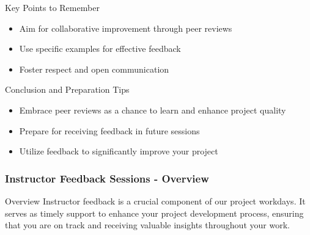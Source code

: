 \documentclass[aspectratio=169]{beamer}
\begin{document}
\begin{frame}[fragile]{Key Points to Remember}
    \begin{itemize}
        \item Aim for collaborative improvement through peer reviews
        \item Use specific examples for effective feedback
        \item Foster respect and open communication
    \end{itemize}
\end{frame}

\begin{frame}[fragile]{Conclusion and Preparation Tips}
    \begin{itemize}
        \item Embrace peer reviews as a chance to learn and enhance project quality
        \item Prepare for receiving feedback in future sessions
        \item Utilize feedback to significantly improve your project
    \end{itemize}
\end{frame}

\begin{frame}[fragile]
    \frametitle{Instructor Feedback Sessions - Overview}
    \begin{block}{Overview}
        Instructor feedback is a crucial component of our project workdays. It serves as timely support to enhance your project development process, ensuring that you are on track and receiving valuable insights throughout your work.
    \end{block}
\end{frame}
\end{document}
